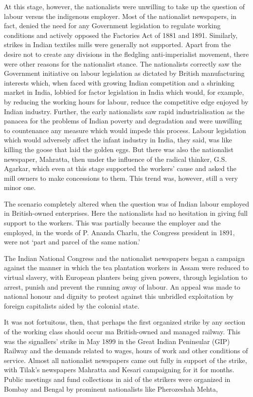 At this stage, however, the nationalists were unwilling to take up the question of labour versus the indigenous employer. Most of the nationalist newspapers, in fact, denied the need for any Government legislation to regulate working conditions and actively opposed the Factories Act of 1881 and 1891. Similarly, strikes in Indian textiles mills were generally not supported. Apart from the desire not to create any divisions in the fledgling anti-imperialist movement, there were other reasons for the nationalist stance. The nationalists correctly saw the Government initiative on labour legislation as dictated by British manufacturing interests which, when faced with growing Indian competition and a shrinking market in India, lobbied for factor legislation in India which would, for example, by reducing the working hours for labour, reduce the competitive edge enjoyed by Indian industry. Further, the early nationalists saw rapid industrialisation as the panacea for the problems of Indian poverty and degradation and were unwilling to countenance any measure which would impede this process. Labour legislation which would adversely affect the infant industry in India, they said, was like killing the goose that laid the golden eggs. But there was also the nationalist newspaper, Mahratta, then under the influence of the radical thinker, G.S. Agarkar, which even at this stage supported the workers' cause and asked the mill owners to make concessions to them. This trend was, however, still a very minor one.

The scenario completely altered when the question was of Indian labour employed in British-owned enterprises. Here the nationalists had no hesitation in giving full support to the workers. This was partially because the employer and the employed, in the words of P. Ananda Charlu, the Congress president in 1891, were not `part and parcel of the same nation.'

The Indian National Congress and the nationalist newspapers began a campaign against the manner in which the tea plantation workers in Assam were reduced to virtual slavery, with European planters being given powers, through legislation to arrest, punish and prevent the running away of labour. An appeal was made to national honour and dignity to protest against this unbridled exploitation by foreign capitalists aided by the colonial state.

It was not fortuitous, then, that perhaps the first organized strike by any section of the working class should occur ma British-owned and managed railway. This was the signallers' strike in May 1899 in the Great Indian Peninsular (GIP) Railway and the demands related to wages, hours of work and other conditions of service. Almost all nationalist newspapers came out fully in support of the strike, with Tilak's newspapers Mahratta and Kesari campaigning for it for months. Public meetings and fund collections in aid of the strikers were organized in Bombay and Bengal by prominent nationalists like Pherozeshah Mehta,

